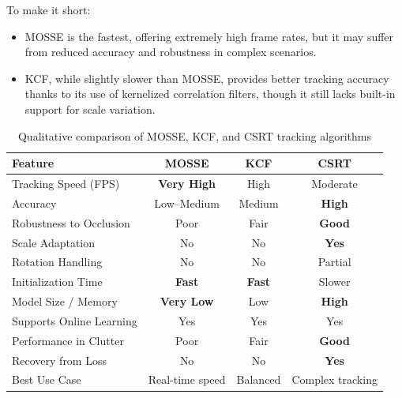 \documentclass[a4paper,12pt]{article}
\begin{document}
To make it short:

\begin{itemize}
    \item MOSSE is the fastest, offering extremely high frame rates, but it may suffer from reduced accuracy and robustness in complex scenarios.
    \item KCF, while slightly slower than MOSSE, provides better tracking accuracy thanks to its use of kernelized correlation filters, though it still lacks built-in support for scale variation.
\end{itemize}



\begin{table}[H]
\centering
\renewcommand{\arraystretch}{1.3}
\begin{tabular}{@{} lccc @{}}
\toprule
\rowcolor{gray!20}
\textbf{Feature} & \textbf{MOSSE} & \textbf{KCF} & \textbf{CSRT} \\
\midrule
Tracking Speed (FPS)        & \textbf{Very High} & High           & Moderate        \\
Accuracy                    & Low–Medium         & Medium         & \textbf{High}   \\
Robustness to Occlusion     & Poor               & Fair           & \textbf{Good}   \\
Scale Adaptation            & No                 & No             & \textbf{Yes}    \\
Rotation Handling           & No                 & No             & Partial         \\
Initialization Time         & \textbf{Fast}      & \textbf{Fast}  & Slower          \\
Model Size / Memory         & \textbf{Very Low}  & Low            & \textbf{High}   \\
Supports Online Learning    & Yes                & Yes            & Yes             \\
Performance in Clutter      & Poor               & Fair           & \textbf{Good}   \\
Recovery from Loss          & No                 & No             & \textbf{Yes}    \\
Best Use Case               & Real-time speed    & Balanced       & Complex tracking \\
\bottomrule
\end{tabular}
\caption{Qualitative comparison of MOSSE, KCF, and CSRT tracking algorithms}
\label{tab:trackers}
\end{table}
\end{document}
